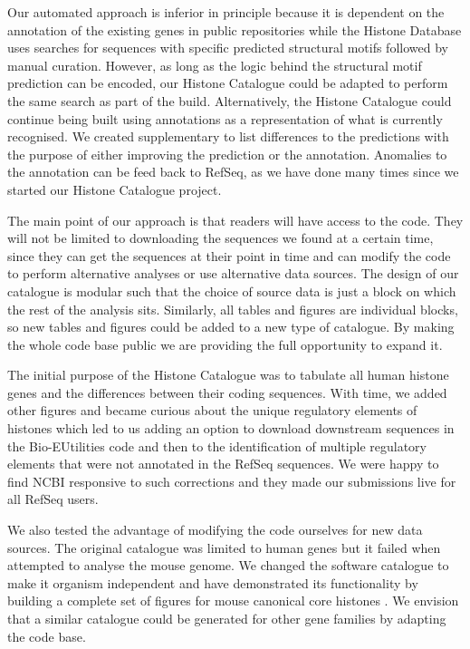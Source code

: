 Our automated
approach is inferior in principle because it is dependent on the
annotation of the existing genes in public repositories
while the Histone Database uses searches for
sequences with specific predicted structural motifs followed by manual
curation.  However, as long
as the logic behind the structural motif prediction can be encoded,
our Histone Catalogue could be adapted to perform the same search as
part of the build.
Alternatively, the Histone Catalogue could continue being built using
annotations as a representation of what is currently
recognised.  We created supplementary  to
list differences to the predictions
with the purpose of either improving the prediction or the
annotation.
Anomalies to the annotation can be feed back to RefSeq, as we have done
many times since we started our Histone Catalogue project.

The main point of our approach is that readers will have access to the
code.  They will not be limited to downloading the sequences we found
at a certain time, since
they can get the sequences at their point in time and can modify the
code to perform alternative analyses or use alternative data sources.
The design of our catalogue is
modular such that the choice of source data is just a block on
which the rest of the
analysis sits.  Similarly, all tables and figures are individual
blocks, so new tables and figures could be added to a new type of catalogue.
By making the whole code base public we are providing the full opportunity
to expand it.

The initial purpose of the Histone Catalogue
was to tabulate all human histone genes and the differences between
their coding sequences.  With time, we added other figures and became
curious about the unique regulatory elements of histones which
led to us adding an option to download downstream sequences in the
Bio-EUtilities code and then to the identification of multiple regulatory
elements that were not annotated in the RefSeq sequences.  We were
happy to find NCBI responsive to such corrections and they made
our submissions live for all RefSeq users.

We also tested the advantage of modifying the code ourselves for new
data sources.  The original catalogue was limited to human genes but it
failed when attempted to analyse the mouse genome.  We changed
the software catalogue to make it organism independent and have
demonstrated its functionality by building a complete set of figures
for mouse canonical core histones
.  We envision that a similar catalogue
could be generated for other gene families by adapting the code base.

